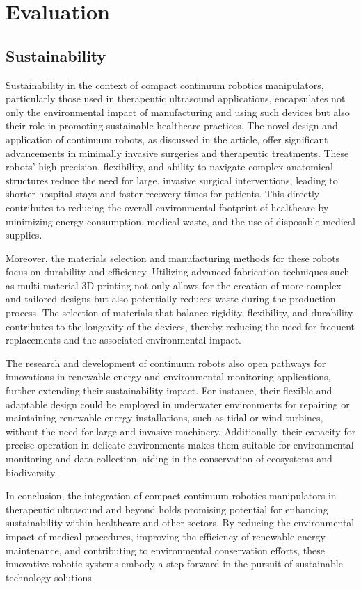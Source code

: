 \section{Evaluation}
\subsection{Sustainability}
Sustainability in the context of compact continuum robotics manipulators, particularly those used in therapeutic 
ultrasound applications, encapsulates not only the environmental impact of manufacturing and using such devices 
but also their role in promoting sustainable healthcare practices. The novel design and application of continuum 
robots, as discussed in the article, offer significant advancements in minimally invasive surgeries and therapeutic 
treatments. These robots' high precision, flexibility, and ability to navigate complex anatomical structures reduce 
the need for large, invasive surgical interventions, leading to shorter hospital stays and faster recovery times for 
patients. This directly contributes to reducing the overall environmental footprint of healthcare by minimizing energy 
consumption, medical waste, and the use of disposable medical supplies.

Moreover, the materials selection and manufacturing methods for these robots focus on durability and efficiency. Utilizing 
advanced fabrication techniques such as multi-material 3D printing not only allows for the creation of more complex and 
tailored designs but also potentially reduces waste during the production process. The selection of materials that balance 
rigidity, flexibility, and durability contributes to the longevity of the devices, thereby reducing the need for frequent 
replacements and the associated environmental impact. 

The research and development of continuum robots also open pathways for innovations in renewable energy and environmental 
monitoring applications, further extending their sustainability impact. For instance, their flexible and adaptable design 
could be employed in underwater environments for repairing or maintaining renewable energy installations, such as tidal 
or wind turbines, without the need for large and invasive machinery. Additionally, their capacity for precise operation 
in delicate environments makes them suitable for environmental monitoring and data collection, aiding in the conservation 
of ecosystems and biodiversity. 

In conclusion, the integration of compact continuum robotics manipulators in therapeutic ultrasound and beyond holds 
promising potential for enhancing sustainability within healthcare and other sectors. By reducing the environmental 
impact of medical procedures, improving the efficiency of renewable energy maintenance, and contributing to environmental 
conservation efforts, these innovative robotic systems embody a step forward in the pursuit of sustainable technology solutions. 


